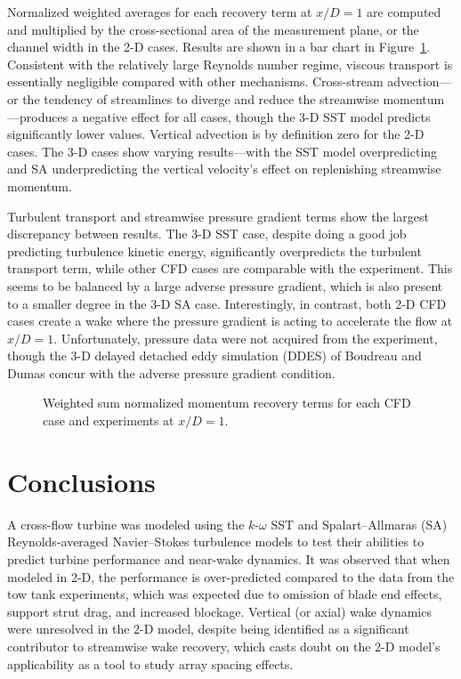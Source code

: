 Normalized weighted averages for each recovery term at $x/D=1$ are computed and
multiplied by the cross-sectional area of the measurement plane, or the channel
width in the 2-D cases. Results are shown in a bar chart in
Figure~\ref{fig:recovery}. Consistent with the relatively large Reynolds number
regime, viscous transport is essentially negligible compared with other
mechanisms. Cross-stream advection---or the tendency of streamlines to diverge
and reduce the streamwise momentum---produces a negative effect for all cases,
though the 3-D SST model predicts significantly lower values. Vertical advection
is by definition zero for the 2-D cases. The 3-D cases show varying
results---with the SST model overpredicting and SA underpredicting the vertical
velocity's effect on replenishing streamwise momentum.

Turbulent transport and streamwise pressure gradient terms show the largest
discrepancy between results. The 3-D SST case, despite doing a good job
predicting turbulence kinetic energy, significantly overpredicts the turbulent
transport term, while other CFD cases are comparable with the experiment. This
seems to be balanced by a large adverse pressure gradient, which is also present
to a smaller degree in the 3-D SA case. Interestingly, in contrast, both 2-D CFD
cases create a wake where the pressure gradient is acting to accelerate the flow
at $x/D=1$. Unfortunately, pressure data were not acquired from the experiment,
though the 3-D delayed detached eddy simulation (DDES) of Boudreau and Dumas
\cite{Boudreau2015} concur with the adverse pressure gradient condition.

\begin{figure}[ht]
    \centering


    \caption{Weighted sum normalized momentum recovery terms for each CFD case
        and experiments\cite{Bachant2016-RVAT-Re-dep} at $x/D=1$.}

    \label{fig:recovery}
\end{figure}


\section{Conclusions}

A cross-flow turbine was modeled using the $k$-$\omega$ SST and
Spalart--Allmaras (SA) Reynolds-averaged Navier--Stokes turbulence models to test
their abilities to predict turbine performance and near-wake dynamics. It was
observed that when modeled in 2-D, the performance is over-predicted compared to
the data from the tow tank experiments, which was expected due to omission of
blade end effects, support strut drag, and increased blockage. Vertical (or
axial) wake dynamics were unresolved in the 2-D model, despite being identified
as a significant contributor to streamwise wake recovery, which casts doubt on
the 2-D model's applicability as a tool to study array spacing effects.

